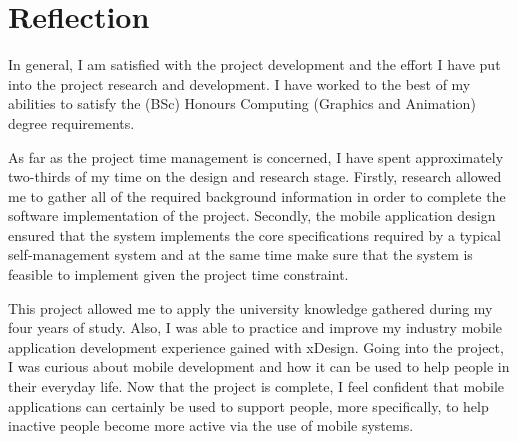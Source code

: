 \section{Reflection}
In general, I am satisfied with the project development and the effort I have put into the project research and development. I have worked to the best of my abilities to satisfy the (BSc) Honours Computing (Graphics and Animation) degree requirements.

As far as the project time management is concerned, I have spent approximately two-thirds of my time on the design and research stage. Firstly, research allowed me to gather all of the required background information in order to complete the software implementation of the project. Secondly, the mobile application design ensured that the system implements the core specifications required by a typical self-management system and at the same time make sure that the system is feasible to implement given the project time constraint.

This project allowed me to apply the university knowledge gathered during my four years of study. Also, I was able to practice and improve my industry mobile application development experience gained with xDesign. Going into the project, I was curious about mobile development and how it can be used to help people in their everyday life. Now that the project is complete, I feel confident that mobile applications can certainly be used to support people, more specifically, to help inactive people become more active via the use of mobile systems.
